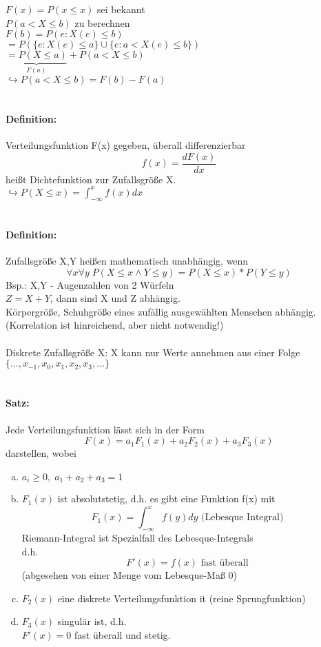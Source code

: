 \documentclass[a4paper,12pt]{scrartcl}
\begin{document}

$F(x) = P(x\leq x)$ sei bekannt\\
$P(a<X\leq b)$ zu berechnen\\
$F(b) = P(e: X(e)\leq b)$\\
\quad$= P(\{e: X(e)\leq a\}\cup\{e: a<X(e)\leq b\})$\\
\quad$\underbrace{= P(X \leq a)}_{F(a)} + P(a<X\leq b)$\\
$\hookrightarrow P(a<X\leq b) = F(b) - F(a)$\\
\\
\paragraph{Definition:} Verteilungsfunktion F(x) gegeben, überall differenzierbar
$$f(x) = \frac{dF(x)}{dx}$$
heißt Dichtefunktion zur Zufallsgröße X.\\
$\hookrightarrow P(X\leq x) = \int_{-\infty}^{x}f(x) dx$\\
\\
\paragraph{Definition:} Zufallsgröße X,Y heißen mathematisch unabhängig, wenn
$$\forall x\forall y\;P(X\leq x \wedge Y\leq y) = P(X\leq x) * P(Y\leq y) $$
Bsp.: X,Y - Augenzahlen von 2 Würfeln\\
$Z = X+Y$, dann sind X und Z abhängig.\\
Körpergröße, Schuhgröße eines zufällig ausgewählten Menschen abhängig.\\
(Korrelation ist hinreichend, aber nicht notwendig!)\\
\\
Diskrete Zufallsgröße X: X kann nur Werte annehmen aus einer Folge $\{\dots,x_{-1},x_0,x_1,x_2,x_3,\dots\} $\\
\\
\paragraph{Satz:} Jede Verteilungsfunktion lässt sich in der Form
$$F(x) = a_1F_1(x) + a_2F_2(x)+a_3F_3(x)$$
darstellen, wobei
\begin{enumerate}[(a)]
 \item $a_i \geq 0,\;a_1+a_2+a_3=1 $
 \item $F_1(x)$ ist absolutstetig, d.h. es gibt eine Funktion f(x) mit
 $$F_1(x) = \int_{-\infty}^xf(y)dy \text{   (Lebesque Integral)}$$
 Riemann-Integral ist Spezialfall des Lebesque-Integrals\\
 d.h.
 $$F'(x) = f(x) \text{  fast überall} $$
 (abgesehen von einer Menge vom Lebesque-Maß 0)
 \item $F_2(x) $ eine diskrete Verteilungsfunktion it (reine Sprungfunktion)
 \item $F_3(x) $ singulär ist, d.h.\\
       $F'(x) = 0$ fast überall und stetig.
\end{enumerate}
\end{document}

